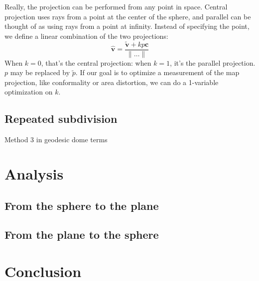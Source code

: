 \documentclass{amsart}[12pt]
\begin{document}
Really, the projection can be performed from any point in space. Central
projection uses rays from a point at the center of the sphere, and parallel can
be thought of as using rays from a point at infinity. Instead of specifying the
point, we define a linear combination of the two projections:
\begin{equation}
  \hat{\mathbf v} = \frac{\widetilde{\mathbf v} + kp\mathbf c}{\|\dots\|}
\end{equation}
When $k=0$, that's the central projection: when $k=1$, it's the parallel
projection. $p$ may be replaced by $\widetilde{p}$. If our goal is to optimize
a measurement of the map projection, like conformality or area distortion, we
can do a 1-variable optimization on $k$.

\subsection{Repeated subdivision}
Method 3 in geodesic dome terms

\section{Analysis}
\subsection{From the sphere to the plane}

\subsection{From the plane to the sphere}

\section{Conclusion}



\end{document}
